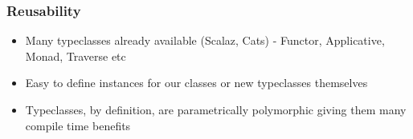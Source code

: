\begin{frame}[fragile]
  \frametitle{Reusability}
  \begin{itemize}
  \item Many typeclasses already available (Scalaz, Cats) - Functor, Applicative, Monad, Traverse etc
  \item Easy to define instances for our classes or new typeclasses themselves
  \item Typeclasses, by definition, are parametrically polymorphic giving them many compile time benefits
  \end{itemize}
\end{frame}
